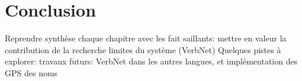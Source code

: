 
\chapter*{Conclusion}

Reprendre synthèse chaque chapitre avec les fait saillants:
mettre en valeur la contribution de la recherche
limites du système (VerbNet)
Quelques pistes à explorer: travaux futurs: VerbNet dans les autres langues, et implémentation des GPS des noms


